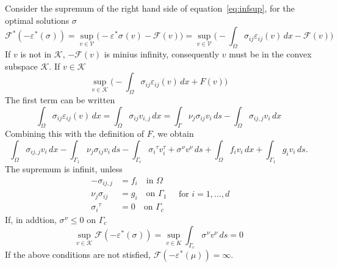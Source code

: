 \documentclass[12pt,a4paper]{article}
\numberwithin{equation}{section}
\numberwithin{table}{section}
\numberwithin{figure}{section}
\newcommand{\V}{\ensuremath{\mathcal{V}}}
\newcommand{\K}{\ensuremath{\mathcal{K}}}
\newcommand{\F}{\ensuremath{{\mathcal F}}}
\newcommand{\intO}{\int_\Omega\!\!}
\newcommand{\intG}[1][0]{\int_{\Gamma_{#1}}\!\!}
\renewcommand{\epsilon}{\varepsilon}
\newcommand{\strain}[1][]{\ensuremath{\epsilon_{#1}}}
\newcommand{\epsij}{\strain[ij]}
\newcommand{\stress}[1][]{\ensuremath{\sigma_{#1}}}
\newcommand{\dx}{{\,dx}}
\newcommand{\ds}{{\,ds}}
\begin{document}
Consider the supremum of the right hand side of equation~\eqref{eq:infsup}, for the optimal solutions $\stress$
\begin{equation}
  \F^*(-\strain^*(\stress)) = \sup_{v \in \V} \bigl(-\strain^* \stress(v)
   - \F(v)\bigr)
  = \sup_{v\in \V} \bigl(-\intO \stress[ij]\epsij(v) \dx - \F(v) \bigr)
\end{equation}
If $v$ is not in $\K$, $-\F(v)$ is minius infinity, consequently $v$ must be in the convex subspace $\K$. If $v\in \K$
\begin{equation}
  \sup_{v\in\K} \bigl(-\intO \stress[ij]\epsij(v) \dx + F(v) \bigr)
\end{equation}
The first term can be written
\begin{equation}
  \intO \stress[ij] \epsij(v) \dx = \intO \stress[ij] v_{i,j} \dx
  = \int_\Gamma \nu_j \stress[ij] v_i \ds - \intO \stress[ij,j] v_i \dx
\end{equation}
Combining this with the definition of $F$, we obtain
\begin{equation}
  \intO \stress[ij,j] v_i \dx - \intG[1] \nu_j \stress[ij] v_i \ds 
  - \intG[c] \stress[i]^\tau v^\tau_i + \stress^\nu v^\nu \ds + \intO f_i v_i \dx
  +   \intG[1] g_i v_i\ds.
\end{equation}
The supremum is infinit, unless
\begin{equation}
  \label{eq:stressEq}
  \begin{split}
    -\stress[ij,j] &= f_i \quad\text{in $\Omega$} \\
    \nu_j \stress[ij] &= g_i \quad\text{on $\Gamma_1$} \\
    \stress[i]^\tau &= 0 \quad\text{on $\Gamma_c$}      
  \end{split}
  \quad\text{for $i=1,\ldots,d$}
\end{equation} 
If, in addtion, $\stress^\nu \le 0$ on $\Gamma_c$
\begin{equation}
  \sup_{v\in\K} \F(-\strain^*(\stress))
  = \sup_{v\in K} \intG[c] \stress^\nu v^\nu \ds = 0
\end{equation}
If the above conditions are not stisfied, $\F(-\strain^*(\mu)) = \infty$.
\end{document}
